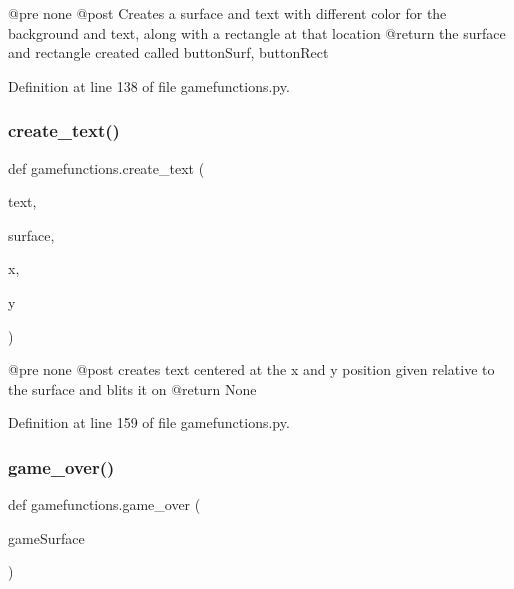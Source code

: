 \begin{DoxyVerb}@pre    none
    @post   Creates a surface and text with different color for the background and text, along with a rectangle at that location
    @return the surface and rectangle created called buttonSurf, buttonRect
\end{DoxyVerb}
 

Definition at line 138 of file gamefunctions.\+py.

\mbox{\label{namespacegamefunctions_aad080841b3df3284089074d16588ed82}} 
\subsubsection{\texorpdfstring{create\+\_\+text()}{create\_text()}}
{\footnotesize\ttfamily def gamefunctions.\+create\+\_\+text (\begin{DoxyParamCaption}\item[{}]{text,  }\item[{}]{surface,  }\item[{}]{x,  }\item[{}]{y }\end{DoxyParamCaption})}

\begin{DoxyVerb}@pre    none
    @post   creates text centered at the x and y position given relative to the surface and blits it on
    @return None
\end{DoxyVerb}
 

Definition at line 159 of file gamefunctions.\+py.

\mbox{\label{namespacegamefunctions_a08a81f3d3aebb362a637fa900ca9af5c}} 
\subsubsection{\texorpdfstring{game\+\_\+over()}{game\_over()}}
{\footnotesize\ttfamily def gamefunctions.\+game\+\_\+over (\begin{DoxyParamCaption}\item[{}]{game\+Surface }\end{DoxyParamCaption})}

